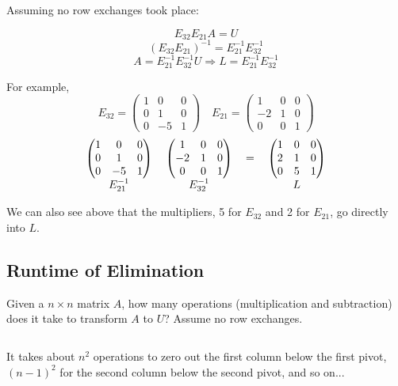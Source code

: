 \documentclass[12pt]{article}
\begin{document}
Assuming no row exchanges took place:

\[E_{32}E_{21}A = U\]
\[(E_{32}E_{21})^{-1} = E_{21}^{-1}E_{32}^{-1}\] 
\[A = E_{21}^{-1}E_{32}^{-1}U \Rightarrow L = E_{21}^{-1}E_{32}^{-1}\]

For example,
\[
E_{32}=
\left(
    \begin{matrix}
        1 & 0 & 0\\
        0 & 1 & 0\\
        0 & -5 & 1
    \end{matrix}
\right)
\quad
E_{21}=
\left(
    \begin{matrix}
        1 & 0 & 0\\
        -2 & 1 & 0\\
        0 & 0 & 1
    \end{matrix}
\right)
\]
\[
  \begin{tabular}{cccc}
    $\left(
        \begin{matrix}
            1 & 0 & 0\\
            0 & 1 & 0\\
            0 & -5 & 1
        \end{matrix}
    \right)$ &
    $\left(
        \begin{matrix}
            1 & 0 & 0\\
            -2 & 1 & 0\\
            0 & 0 & 1
        \end{matrix}
    \right)$ &
    $=$ & 
    $\left(
        \begin{matrix}
            1 & 0 & 0\\
            2 & 1 & 0\\
            0 & 5 & 1
        \end{matrix}
    \right)$\\
    $E_{21}^{-1}$ & $E_{32}^{-1}$ & & $L$
  \end{tabular}
\]

We can also see above that the multipliers, 5 for $E_{32}$ and 2 for $E_{21}$, go directly into $L$.

\subsection{Runtime of Elimination}
Given a $n\times{n}$ matrix $A$, how many operations (multiplication and subtraction) does it take to transform $A$ to $U$? Assume no row exchanges.

$\>$

It takes about $n^2$ operations to zero out the first column below the first pivot, $(n-1)^2$ for the second column below the second pivot, and so on...
\end{document}
